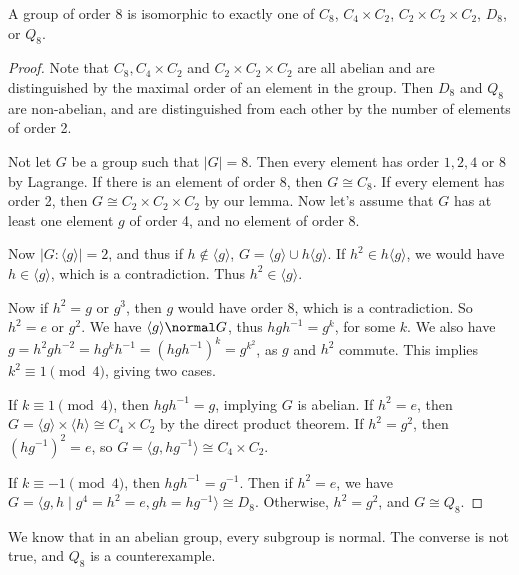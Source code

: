 \begin{theorem}
	A group of order 8 is isomorphic to exactly one of $C_8$, $C_4 \times C_2$, $C_2 \times C_2 \times C_2$, $D_8$, or $Q_8$.
\end{theorem}
\begin{proof}
	Note that $C_8, C_4 \times C_2$ and $C_2 \times C_2 \times C_2$ are all abelian and are distinguished by the maximal order of an element in the group. Then $D_8$ and $Q_8$ are non-abelian, and are distinguished from each other by the number of elements of order 2.

	Not let $G$ be a group such that $|G| = 8$. Then every element has order $1, 2, 4$ or $8$ by Lagrange. If there is an element of order 8, then $G \cong C_8$. If every element has order 2, then $G \cong C_2 \times C_2 \times C_2$ by our lemma. Now let's assume that $G$ has at least one element $g$ of order 4, and no element of order 8.

	Now $|G : \langle g \rangle| = 2$, and thus if $h \not \in \langle g \rangle$, $G = \langle g \rangle \cup h \langle g \rangle$. If $h^2 \in h \langle g \rangle$, we would have $h \in \langle g \rangle$, which is a contradiction. Thus $h^2 \in \langle g \rangle$.

	Now if $h^2 = g$ or $g^3$, then $g$ would have order 8, which is a contradiction. So $h^2 = e$ or $g^2$.
	We have $\langle g \rangle \normal G$, thus $hgh^{-1} = g^k$, for some $k$. We also have $g = h^2 g h^{-2} = h g^{k} h^{-1} = (hgh^{-1})^k = g^{k^2}$, as $g$ and $h^2$ commute. 
	This implies $k^2 \equiv 1 \pmod{4}$, giving two cases.

	If $k \equiv 1 \pmod{4}$, then $hgh^{-1} = g$, implying $G$ is abelian. If $h^2 = e$, then $G = \langle g \rangle \times \langle h \rangle \cong C_4 \times C_2$ by the direct product theorem. If $h^2 = g^2$,  then $(hg^{-1})^2 = e$, so $G = \langle g, hg^{-1} \rangle \cong C_4 \times C_2$.

	If $k \equiv -1 \pmod{4}$, then $hgh^{-1} = g^{-1}$. Then if $h^2 = e$, we have $G = \langle g, h \mid g^4 = h^2 = e, gh = hg^{-1} \rangle \cong D_8$. Otherwise, $h^2 = g^2$, and $G \cong Q_8$.
\end{proof}

\begin{remark}
	We know that in an abelian group, every subgroup is normal. The converse is not true, and $Q_8$ is a counterexample.
\end{remark}


